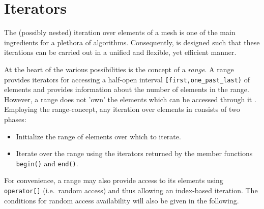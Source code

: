 \chapter{Iterators} \label{chap:iterators}

The (possibly nested) iteration over elements of a mesh is one of the main ingredients for a plethora of algorithms.
Consequently, {\ViennaGrid} is designed such that these iterations can be carried out in a unified and flexible, yet efficient manner.

At the heart of the various possibilities is the concept of a \emph{range}. A range provides iterators for accessing a half-open interval \texttt{[first,one\_past\_last)} of elements and provides information about the number of elements in the range. However, a range does not 'own' the elements which can be accessed through it \cite{boost}. 
Employing the range-concept, any iteration over elements in {\ViennaGrid} consists of two phases:
\begin{itemize}
 \item Initialize the range of elements over which to iterate.
 \item Iterate over the range using the iterators returned by the member functions \lstinline|begin()| and \lstinline|end()|.
\end{itemize}

For convenience, a range may also provide access to its elements using \lstinline|operator[]| (i.e.~random access) and thus allowing an index-based iteration. The conditions for random access availability will also be given in the following.


